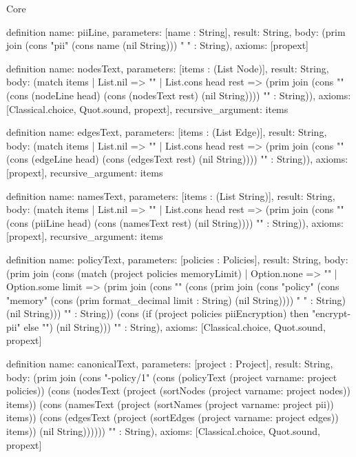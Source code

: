 \begin{lexlean}{Core}
\begin{semanticmodule}
definition{
  name: piiLine,
  parameters: [name : String],
  result: String,
  body: (prim join (cons "pii" (cons name (nil String))) " " : String),
  axioms: [propext]
}

definition{
  name: nodesText,
  parameters: [items : (List Node)],
  result: String,
  body: (match items
    | List.nil => ""
    | List.cons head rest => (prim join (cons "\n" (cons (nodeLine head) (cons (nodesText rest) (nil String)))) "" : String)),
  axioms: [Classical.choice, Quot.sound, propext],
  recursive_argument: items
}

definition{
  name: edgesText,
  parameters: [items : (List Edge)],
  result: String,
  body: (match items
    | List.nil => ""
    | List.cons head rest => (prim join (cons "\n" (cons (edgeLine head) (cons (edgesText rest) (nil String)))) "" : String)),
  axioms: [propext],
  recursive_argument: items
}

definition{
  name: namesText,
  parameters: [items : (List String)],
  result: String,
  body: (match items
    | List.nil => ""
    | List.cons head rest => (prim join (cons "\n" (cons (piiLine head) (cons (namesText rest) (nil String)))) "" : String)),
  axioms: [propext],
  recursive_argument: items
}

definition{
  name: policyText,
  parameters: [policies : Policies],
  result: String,
  body: (prim join (cons (match (project policies memoryLimit)
    | Option.none => ""
    | Option.some limit => (prim join (cons "\n" (cons (prim join (cons "policy" (cons "memory" (cons (prim format_decimal limit : String) (nil String)))) " " : String) (nil String))) "" : String)) (cons (if (project policies piiEncryption) then "\npolicy encrypt-pii" else "") (nil String))) "" : String),
  axioms: [Classical.choice, Quot.sound, propext]
}

definition{
  name: canonicalText,
  parameters: [project : Project],
  result: String,
  body: (prim join (cons "\ndataflow-policy/1" (cons (policyText (project var{name: project} policies)) (cons (nodesText (project (sortNodes (project var{name: project} nodes)) items)) (cons (namesText (project (sortNames (project var{name: project} pii)) items)) (cons (edgesText (project (sortEdges (project var{name: project} edges)) items)) (nil String)))))) "" : String),
  axioms: [Classical.choice, Quot.sound, propext]
}

\end{semanticmodule}
\end{lexlean}
